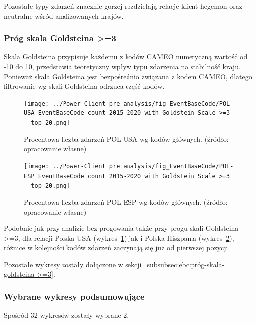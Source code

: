 \documentclass[11pt]{report}
\begin{document}
    Pozostałe typy zdarzeń znacznie gorzej rozdzielają relacje klient-hegemon oraz neutralne wśród analizowanych krajów.

    \subsubsection{Próg skala Goldsteina >=3}
    Skala Goldsteina przypisuje każdemu z kodów CAMEO numeryczną wartość od -10 do 10, przedstawia teoretyczny wpływ typu zdarzenia na stabilność kraju.
    Ponieważ skala Goldsteina jest bezpośrednio związana z kodem CAMEO, dlatego filtrowanie wg skali Goldsteina odrzuca część kodów.

    \begin{figure}[!htp]
        \centering
        \texttt{[image: ../Power-Client pre analysis/fig\_EventBaseCode/POL-USA EventBaseCode count 2015-2020 with Goldstein Scale >=3 - top 20.png]}
        \caption{Procentowa liczba zdarzeń POL-USA wg kodów głównych. (źródło: opracowanie własne)}
        \label{fig:Power-Client:EBC:Goldstein:POL-USA}
    \end{figure}

    \begin{figure}[!htp]
        \centering
        \texttt{[image: ../Power-Client pre analysis/fig\_EventBaseCode/POL-ESP EventBaseCode count 2015-2020 with Goldstein Scale >=3 - top 20.png]}
        \caption{Procentowa liczba zdarzeń POL-ESP wg kodów głównych. (źródło: opracowanie własne)}
        \label{fig:Power-Client:EBC:Goldstein:POL-ESP}
    \end{figure}

    Podobnie jak przy analizie bez progowania także przy progu skali Goldsteina >=3, dla relacji Polska-USA (wykres~\ref{fig:Power-Client:EBC:Goldstein:POL-USA}) jak i Polska-Hiszpania (wykres~\ref{fig:Power-Client:EBC:Goldstein:POL-ESP}),
    różnice w kolejności kodów zdarzeń zaczynają się już od pierwszej pozycji.

    Pozostałe wykresy zostały dołączone w sekcji~\ref{subsubsec:ebc:próg-skala-goldsteina->=3}.

    \subsubsection{Wybrane wykresy podsumowujące}

    Spośród 32 wykresów zostały wybrane 2.
\end{document}

